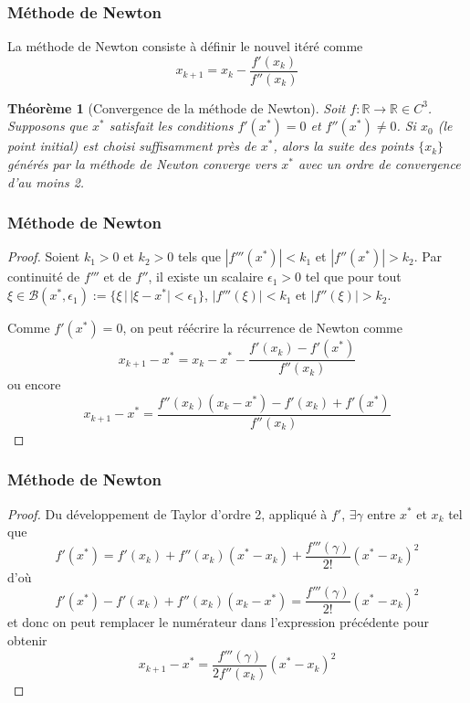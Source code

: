 \documentclass[t,usepdftitle=false]{beamer}
\newtheorem{thm}{Théorème}
\def\cB{\mathcal{B}}
\def\cR{\mathbb{R}}
\begin{document}
\begin{frame}
\frametitle{Méthode de Newton}

La méthode de Newton consiste à définir le nouvel itéré comme
$$
x_{k+1} = x_k - \frac{f'(x_k)}{f''(x_k)}
$$

\begin{thm}[Convergence de la méthode de Newton]
Soit $f: \cR \rightarrow \cR \in C^3$.
Supposons que $x^*$ satisfait les conditions $f'(x^*) = 0$ et
$f''(x^*) \ne 0$.
Si $x_0$ (le point initial) est choisi suffisamment près de $x^*$,
alors la suite des points $\lbrace x_k \rbrace$ générés par la méthode de Newton
converge vers $x^*$ avec un ordre de convergence d'au moins 2.
\end{thm}
\end{frame}

\begin{frame}
\frametitle{Méthode de Newton}

\begin{proof}
Soient $k_1 > 0$ et $k_2 > 0$ tels que $|f'''(x^*)| < k_1$ et $|f''(x^*)| > k_2$.
Par continuité de $f'''$ et de $f''$, il existe un scalaire $\epsilon_1 > 0$ tel que pour
tout $\xi \in \cB(x^*, \epsilon_1) := \{ \xi \,|\, |\xi - x^*| < \epsilon_1 \}$, $|f'''(\xi)| < k_1$ et $|f''(\xi)| > k_2$.

Comme $f'(x^*) = 0$, on peut réécrire la récurrence de Newton comme
$$
x_{k+1}-x^* = x_k-x^* - \frac{f'(x_k)-f'(x^*)}{f''(x_k)}
$$
ou encore
$$
x_{k+1}-x^* = \frac{f''(x_k)(x_k-x^*) - f'(x_k)+f'(x^*)}{f''(x_k)}
$$
\end{proof}

\end{frame}

\begin{frame}
\frametitle{Méthode de Newton}

\begin{proof}
Du développement de Taylor d'ordre 2, appliqué à $f'$, $\exists \gamma$ entre $x^*$ et $x_k$ tel que
$$
f'(x^*) = f'(x_k) + f''(x_k)(x^*-x_k)+\frac{f'''(\gamma)}{2!}(x^*-x_k)^2
$$
d'où
$$
f'(x^*) - f'(x_k) + f''(x_k)(x_k-x^*) = \frac{f'''(\gamma)}{2!}(x^*-x_k)^2
$$
et donc on peut remplacer le numérateur dans l'expression précédente pour obtenir
$$
x_{k+1}-x^* = \frac{f'''(\gamma)}{2f''(x_k)}(x^*-x_k)^2
$$
\end{proof}

\end{frame}
\end{document}
